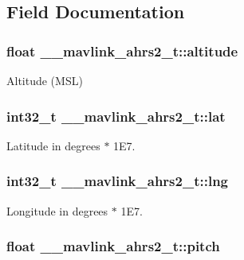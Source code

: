 \subsection{Field Documentation}
\hypertarget{struct____mavlink__ahrs2__t_a629a5e1401ac649da94088a0ce6b82fc}{
\subsubsection[{altitude}]{\setlength{\rightskip}{0pt plus 5cm}float \+\_\+\+\_\+mavlink\+\_\+ahrs2\+\_\+t\+::altitude}}\label{struct____mavlink__ahrs2__t_a629a5e1401ac649da94088a0ce6b82fc}


Altitude (M\+S\+L) 

\hypertarget{struct____mavlink__ahrs2__t_a5784fe6c6f8459fc3f8000f5a0ac2a4d}{
\subsubsection[{lat}]{\setlength{\rightskip}{0pt plus 5cm}int32\+\_\+t \+\_\+\+\_\+mavlink\+\_\+ahrs2\+\_\+t\+::lat}}\label{struct____mavlink__ahrs2__t_a5784fe6c6f8459fc3f8000f5a0ac2a4d}


Latitude in degrees $\ast$ 1\+E7. 

\hypertarget{struct____mavlink__ahrs2__t_ad72c104f2a5def605811023bc056ce55}{
\subsubsection[{lng}]{\setlength{\rightskip}{0pt plus 5cm}int32\+\_\+t \+\_\+\+\_\+mavlink\+\_\+ahrs2\+\_\+t\+::lng}}\label{struct____mavlink__ahrs2__t_ad72c104f2a5def605811023bc056ce55}


Longitude in degrees $\ast$ 1\+E7. 

\hypertarget{struct____mavlink__ahrs2__t_a55cddc3c2958e03cfb510b85c7b2e47c}{
\subsubsection[{pitch}]{\setlength{\rightskip}{0pt plus 5cm}float \+\_\+\+\_\+mavlink\+\_\+ahrs2\+\_\+t\+::pitch}}\label{struct____mavlink__ahrs2__t_a55cddc3c2958e03cfb510b85c7b2e47c}


